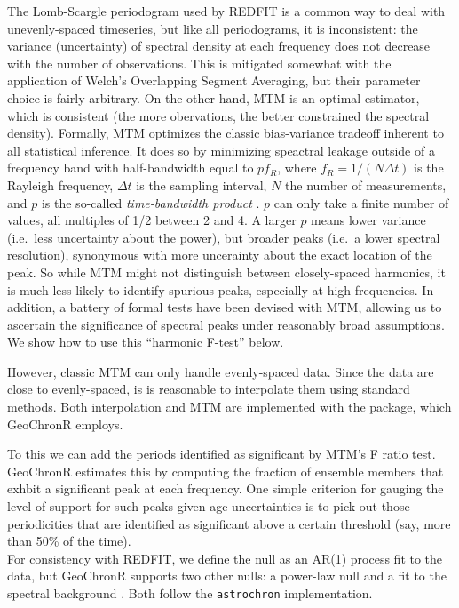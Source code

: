 \documentclass[gchron, manuscript]{copernicus}
\begin{document}
The Lomb-Scargle periodogram used by REDFIT is a common way to deal with unevenly-spaced timeseries, but like all periodograms, it is inconsistent: the variance (uncertainty) of spectral density at each frequency does not decrease with the number of observations. This is mitigated somewhat with the application of Welch's Overlapping Segment Averaging, but their parameter choice is fairly arbitrary.
On the other hand, MTM \citep{thomson82} is an optimal estimator, which is consistent (the more obervations, the better constrained the spectral density).
Formally, MTM optimizes the classic bias-variance tradeoff inherent to all statistical inference.
It does so by minimizing speactral leakage outside of a frequency band with half-bandwidth equal to \(pf_R\), where \(f_R=1/(N \Delta t)\) is the Rayleigh frequency, \(\Delta t\) is the sampling interval, \(N\) the number of measurements, and \(p\) is the so-called \emph{time-bandwidth product} \citep{Ghil02}.
\(p\) can only take a finite number of values, all multiples of 1/2 between 2 and 4.
A larger \(p\) means lower variance (i.e.~less uncertainty about the power), but broader peaks (i.e.~a lower spectral resolution), synonymous with more uncerainty about the exact location of the peak.
So while MTM might not distinguish between closely-spaced harmonics, it is much less likely to identify spurious peaks, especially at high frequencies.
In addition, a battery of formal tests have been devised with MTM, allowing us to ascertain the significance of spectral peaks under reasonably broad assumptions.
We show how to use this ``harmonic F-test'' below.

However, classic MTM can only handle evenly-spaced data.
Since the data are close to evenly-spaced, is is reasonable to interpolate them using standard methods.
Both interpolation and MTM are implemented with the \citep[astrochron][]{astrochron} package, which GeoChronR employs.

To this we can add the periods identified as significant by MTM's F ratio test.
GeoChronR estimates this by computing the fraction of ensemble members that exhbit a significant peak at each frequency.
One simple criterion for gauging the level of support for such peaks given age uncertainties is to pick out those periodicities that are identified as significant above a certain threshold (say, more than 50\% of the time).\\
For consistency with REDFIT, we define the null as an AR(1) process fit to the data, but GeoChronR supports two other nulls: a power-law null and a fit to the spectral background \citep{MannLees96}.
Both follow the \texttt{astrochron} implementation.
\end{document}
